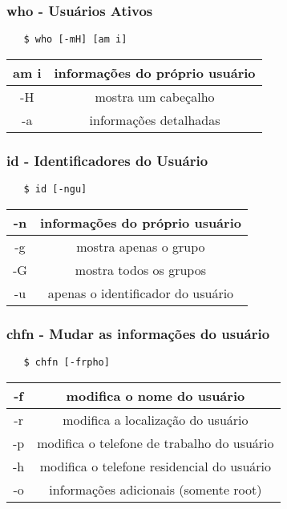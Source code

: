 \documentclass{beamer}
\begin{document}
\begin{frame}[fragile]
   \frametitle{who - Usuários Ativos}
   \begin{verbatim}
   $ who [-mH] [am i]
   \end{verbatim}
   \begin{table}
      \begin{tabular}{ c | c }
         am i & informações do próprio usuário \\
         \hline 
         -H & mostra um cabeçalho \\ 
         \hline
	 -a & informações detalhadas \\ 
         \hline
      \end{tabular}
   \end{table}
\end{frame}

\begin{frame}[fragile]
   \frametitle{id - Identificadores do Usuário}
   \begin{verbatim}
   $ id [-ngu]
   \end{verbatim}
   \begin{table}
      \begin{tabular}{ c | c }
         -n & informações do próprio usuário \\
         \hline 
         -g & mostra apenas o grupo \\ 
         \hline
	 -G & mostra todos os grupos \\ 
         \hline
	 -u & apenas o identificador do usuário \\ 
      \end{tabular}
   \end{table}
\end{frame}

\begin{frame}[fragile]
   \frametitle{chfn - Mudar as informações do usuário}
   \begin{verbatim}
   $ chfn [-frpho]
   \end{verbatim}
   \begin{table}
      \begin{tabular}{ c | c }
         -f & modifica o nome do usuário \\
         \hline 
         -r & modifica a localização do usuário \\ 
         \hline
	 -p & modifica o telefone de trabalho do usuário \\
         \hline
	 -h & modifica o telefone residencial do usuário \\ 
         \hline
         -o & informações adicionais (somente root) \\ 
      \end{tabular}
   \end{table}
\end{frame}
\end{document}
